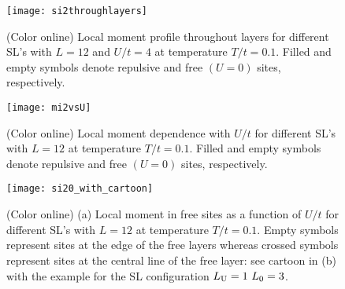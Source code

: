 \documentclass[aps,pra,reprint,twocolumn,showpacs,longbibliography,superscriptaddress]{revtex4-1}
\begin{document}
\begin{figure}[!tb] %
  \texttt{[image: si2throughlayers]}
 \caption{(Color online) Local moment profile throughout layers for different SL's with $L=12$ and $U/t=4$ at temperature $T/t=0.1$. Filled and empty symbols denote repulsive and free $(U=0)$ sites, respectively.}
 \label{fig:si2throughlayers}
\end{figure}

\begin{figure}[!tb] %
  \texttt{[image: mi2vsU]}
 \caption{(Color online) Local moment dependence with $U/t$ for different SL's with $L=12$ at temperature $T/t=0.1$. Filled and empty symbols denote repulsive and free $(U=0)$ sites, respectively.}
 \label{fig:mi2vsU}
\end{figure}

\begin{figure}[!tb] %
  \texttt{[image: si20\_with\_cartoon]}
 \caption{(Color online) (a) Local moment in free sites as a function of $U/t$ for different SL's with $L=12$ at temperature $T/t=0.1$. Empty symbols represent sites at the edge of the free layers whereas crossed symbols represent sites at the central line of the free layer: see cartoon in (b) with the example for the SL configuration $L_{\rm U} = 1 \,\, L_0=3$.}
 \label{fig:si20}
\end{figure}
 
\end{document}
